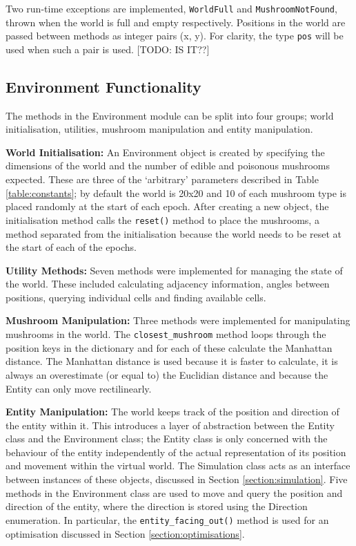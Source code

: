 \documentclass[12pt,a4paper]{report}
\begin{document}
Two run-time exceptions are implemented, \texttt{WorldFull} and \texttt{MushroomNotFound}, thrown when the world is full and empty respectively. Positions in the world are passed between methods as integer pairs (x, y). For clarity, the type \texttt{pos} will be used when such a pair is used. [TODO: IS IT??]

\subsection{Environment Functionality}

The methods in the Environment module can be split into four groups; world initialisation, utilities, mushroom manipulation and entity manipulation.

{\bf World Initialisation:} An Environment object is created by specifying the dimensions of the world and the number of edible and poisonous mushrooms expected. These are three of the `arbitrary' parameters described in Table \ref{table:constants}; by default the world is 20x20 and 10 of each mushroom type is placed randomly at the start of each epoch. After creating a new object, the initialisation method calls the \texttt{reset()} method to place the mushrooms, a method separated from the initialisation because the world needs to be reset at the start of each of the epochs.

{\bf Utility Methods:} Seven methods were implemented for managing the state of the world. These included calculating adjacency information, angles between positions, querying individual cells and finding available cells.

{\bf Mushroom Manipulation:} Three methods were implemented for manipulating mushrooms in the world. The \texttt{closest\_mushroom} method loops through the position keys in the dictionary and for each of these calculate the Manhattan distance. The Manhattan distance is used because it is faster to calculate, it is always an overestimate (or equal to) the Euclidian distance and because the Entity can only move rectilinearly.

{\bf Entity Manipulation:} The world keeps track of the position and direction of the entity within it. This introduces a layer of abstraction between the Entity class and the Environment class; the Entity class is only concerned with the behaviour of the entity independently of the actual representation of its position and movement within the virtual world. The Simulation class acts as an interface between instances of these objects, discussed in Section \ref{section:simulation}. Five methods in the Environment class are used to move and query the position and direction of the entity, where the direction is stored using the Direction enumeration. In particular, the \texttt{entity\_facing\_out()} method is used for an optimisation discussed in Section \ref{section:optimisations}.
\end{document}
